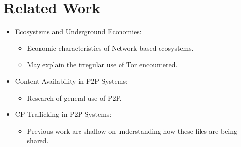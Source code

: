 \documentclass[notes]{beamer}
\begin{document}
\section{Related Work}
\begin{frame}

\begin{itemize}

\item[\checkmark]Ecosystems and Underground Economies:

	\begin{itemize}

	\item Economic characteristics of Network-based ecosystems.
	
	\item May explain the irregular use of Tor encountered.	
	
	\end{itemize}
	
\item[\checkmark]Content Availability in P2P Systems:

	\begin{itemize}
	
	\item Research of general use of P2P.	
	
	\end{itemize}

\item[\checkmark]CP Trafficking in P2P Systems:

	\begin{itemize}
	
	\item Previous work are shallow on understanding how these files are being shared.
	
	\end{itemize}

\end{itemize}

\end{frame}
\end{document}
